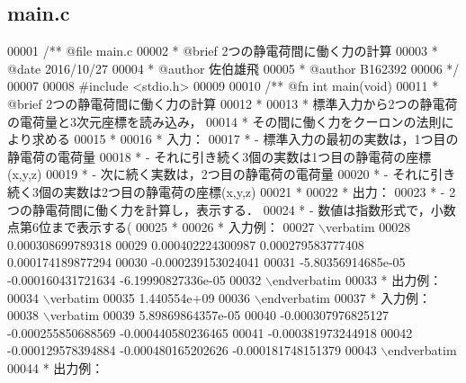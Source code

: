 \subsection{main.\-c}

\begin{DoxyCode}
00001 \textcolor{comment}{/**  @file main.c}
00002 \textcolor{comment}{ *   @brief  2つの静電荷間に働く力の計算}
00003 \textcolor{comment}{ *   @date   2016/10/27}
00004 \textcolor{comment}{ *   @author 佐伯雄飛}
00005 \textcolor{comment}{ *   @author B162392}
00006 \textcolor{comment}{ */}
00007 
00008 \textcolor{preprocessor}{#include <stdio.h>}
00009 \textcolor{comment}{}
00010 \textcolor{comment}{/** @fn int main(void)}
00011 \textcolor{comment}{ *  @brief  2つの静電荷間に働く力の計算}
00012 \textcolor{comment}{ *}
00013 \textcolor{comment}{ *  標準入力から2つの静電荷の電荷量と3次元座標を読み込み，}
00014 \textcolor{comment}{ *  その間に働く力をクーロンの法則により求める}
00015 \textcolor{comment}{ *}
00016 \textcolor{comment}{ *  入力：}
00017 \textcolor{comment}{ *  - 標準入力の最初の実数は，1つ目の静電荷の電荷量}
00018 \textcolor{comment}{ *  - それに引き続く3個の実数は1つ目の静電荷の座標(x,y,z)}
00019 \textcolor{comment}{ *  - 次に続く実数は，2つ目の静電荷の電荷量}
00020 \textcolor{comment}{ *  - それに引き続く3個の実数は2つ目の静電荷の座標(x,y,z)}
00021 \textcolor{comment}{ *}
00022 \textcolor{comment}{ *  出力：}
00023 \textcolor{comment}{ *  - 2つの静電荷間に働く力を計算し，表示する．}
00024 \textcolor{comment}{ *  - 数値は指数形式で，小数点第6位まで表示する(%
00025 \textcolor{comment}{ *}
00026 \textcolor{comment}{ *  入力例：}
00027 \textcolor{comment}{\(\backslash\)verbatim}
00028 \textcolor{comment}{0.000308699789318}
00029 \textcolor{comment}{0.000402224300987 0.000279583777408 0.000174189877294}
00030 \textcolor{comment}{-0.000239153024041}
00031 \textcolor{comment}{-5.80356914685e-05 -0.000160431721634 -6.19990827336e-05}
00032 \textcolor{comment}{\(\backslash\)endverbatim}
00033 \textcolor{comment}{  *  出力例：}
00034 \textcolor{comment}{\(\backslash\)verbatim}
00035 \textcolor{comment}{1.440554e+09}
00036 \textcolor{comment}{\(\backslash\)endverbatim}
00037 \textcolor{comment}{  *  入力例：}
00038 \textcolor{comment}{\(\backslash\)verbatim}
00039 \textcolor{comment}{5.89869864357e-05}
00040 \textcolor{comment}{-0.000307976825127 -0.000255850688569 -0.000440580236465}
00041 \textcolor{comment}{-0.000381973244918}
00042 \textcolor{comment}{-0.000129578394884 -0.000480165202626 -0.000181748151379}
00043 \textcolor{comment}{\(\backslash\)endverbatim}
00044 \textcolor{comment}{  *  出力例：}
}
\end{DoxyCode}
